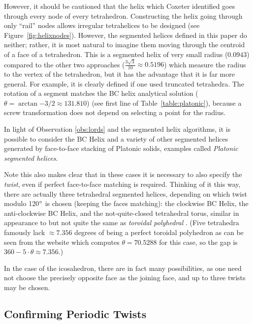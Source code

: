 \documentclass[mathematics,article,submit,pdftex,moreauthors]{Definitions/mdpi}
\begin{document}
However, it should be cautioned that the helix which Coxeter identified \cite{coxeter1985simplicial}
goes through every node of every tetrahedron. Constructing the helix going
through only ``rail'' nodes allows irregular tetrahelices to be designed \cite{read2018transforming}
(see Figure~\ref{fig:helixnodes}).
However, the segmented helices defined in this paper do neither; rather, it is most natural to
imagine them moving through the centroid of a face of a tetrahedron.
This is a segmented helix of
very small radius ($0.0943$) compared to the other two approaches
($\frac{3\sqrt{3}}{10} \approx 0.5196$) which measure the radius to the
vertex of the tetrahedron, but it has
the advantage that it is far more general. For example, it is
clearly defined if one used truncated tetrahedra.
The rotation of a
segment matches the BC helix analytical solution
($\theta = \arctan{-3/2} \approx 131.810$) (see first line of Table~\ref{table:platonic}),
because a screw transformation does not depend on selecting a point for the radius.

In light of Observation \ref{obs:lords} and the segmented helix algorithms, it is possible to
consider the BC Helix and a variety of other segmented helices generated by
face-to-face stacking of Platonic solids, examples called {\em Platonic segmented helices}.

Note this also makes clear that in these cases it is necessary to also specify the {\em twist},
even if perfect face-to-face matching is required.
Thinking of it this
way, there are actually three tetrahedral segmented helices,
depending on which twist modulo 120$\degree$
is chosen (keeping the faces matching): the clockwise BC Helix, the anti-clockwise BC Helix, and the
not-quite-closed tetrahedral torus, similar in appearance to but not quite the same as
{\em toroidal polyhedral} \cite{wiki:toroidalpolyhedra}.
(Five tetrahedra famously lack $\approx 7.356$ degrees of being a perfect toroidal polyhedron
as can be seen from the website which computes $\theta = 70.5288$ for this case,
so the gap is $360 - 5 \cdot \theta \approx 7.356$.)

In the case of the icosahedron, there are in fact many possibilities,
as one need not choose the precisely opposite face as the joining face, and
up to three twists may be chosen.


\subsection{Confirming Periodic Twists}
\end{document}
